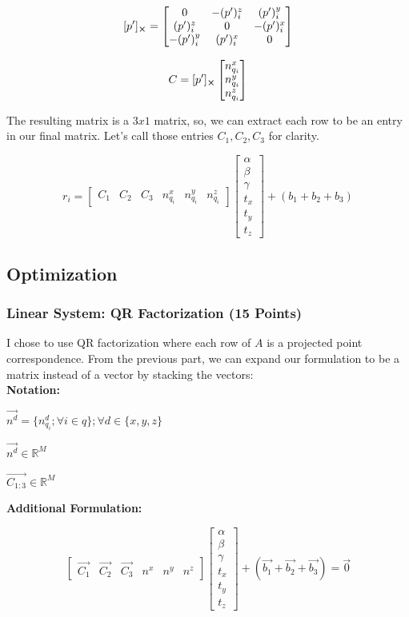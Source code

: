 \documentclass[12pt, a4paper]{article}
\begin{document}
$$[p']_{\cross} = 
\begin{bmatrix}
    0 & -(p')_i^z & (p')_i^y \\
    (p')_i^z & 0 & -(p')_i^x\\
    -(p')_i^y  & (p')_i^x & 0
\end{bmatrix}
$$

$$
C =
[p']_{\cross}
\begin{bmatrix}
    n^x_{q_i} \\
    n^y_{q_i} \\
    n^z_{q_i} 
\end{bmatrix}
$$

The resulting matrix is a $3x1$ matrix, so, we can extract each row to be an entry in our final matrix. Let's call those entries $C_{1}, C_{2}, C_{3}$ for clarity.


$$r_i = \begin{bmatrix}
    C_1 &
    C_2 &
    C_3 & 
    n^x_{q_i} &
    n^y_{q_i} &
    n^z_{q_i}
\end{bmatrix}
\begin{bmatrix}
    \alpha \\
    \beta \\
    \gamma \\
    t_x \\
    t_y \\
    t_z
\end{bmatrix}
+
(b_1 + b_2 + b_3)
$$

\subsection{Optimization}

\subsubsection{Linear System: QR Factorization (15 Points)}
I chose to use QR factorization where each row of $A$ is a projected point correspondence. From the previous part, we can expand our formulation to be a matrix instead of a vector by stacking the vectors:\\
\textbf{Notation:}

$\vec{n^d} = \{n^d_{q_i} ; \forall i \in q \}; \forall d \in \{x, y, z\}$

$\vec{n^d} \in \mathbb{R}^M$

$\vec{C_{1:3}} \in \mathbb{R}^M$

\textbf{Additional Formulation:}

$$\begin{bmatrix}
    \vec{C_1} &
    \vec{C_2} &
    \vec{C_3} & 
    n^x &
    n^y &
    n^z
\end{bmatrix}
\begin{bmatrix}
    \alpha \\
    \beta \\
    \gamma \\
    t_x \\
    t_y \\
    t_z
\end{bmatrix}
+
(\vec{b_1} + \vec{b_2} + \vec{b_3}) = 
\vec{0}
$$
\end{document}

